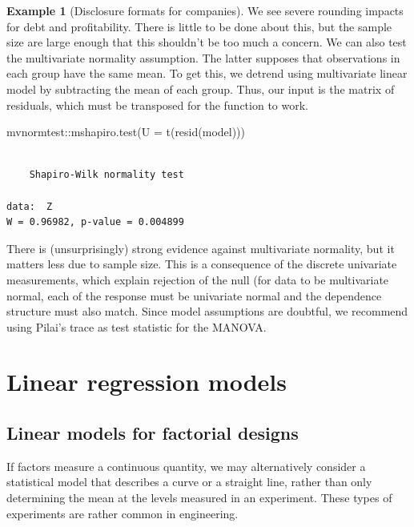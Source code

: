 \documentclass[
  11pt,
  letterpaper,
]{scrbook}
\newenvironment{Shaded}{\begin{snugshade}}{\end{snugshade}}
\newcommand{\AttributeTok}[1]{\textcolor[rgb]{0.40,0.45,0.13}{#1}}
\newcommand{\FunctionTok}[1]{\textcolor[rgb]{0.28,0.35,0.67}{#1}}
\newcommand{\NormalTok}[1]{\textcolor[rgb]{0.00,0.23,0.31}{#1}}
\newcommand{\SpecialCharTok}[1]{\textcolor[rgb]{0.37,0.37,0.37}{#1}}
\theoremstyle{definition}
\newtheorem{example}{Example}[chapter]
\theoremstyle{definition}
\theoremstyle{remark}
\begin{document}
\begin{example}[Disclosure formats for
companies]
We see severe rounding impacts for debt and profitability. There is
little to be done about this, but the sample size are large enough that
this shouldn't be too much a concern. We can also test the multivariate
normality assumption. The latter supposes that observations in each
group have the same mean. To get this, we detrend using multivariate
linear model by subtracting the mean of each group. Thus, our input is
the matrix of residuals, which must be transposed for the function to
work.

\begin{Shaded}
\begin{Highlighting}[]
\NormalTok{mvnormtest}\SpecialCharTok{::}\FunctionTok{mshapiro.test}\NormalTok{(}\AttributeTok{U =} \FunctionTok{t}\NormalTok{(}\FunctionTok{resid}\NormalTok{(model)))}
\end{Highlighting}
\end{Shaded}

\begin{verbatim}

    Shapiro-Wilk normality test

data:  Z
W = 0.96982, p-value = 0.004899
\end{verbatim}

There is (unsurprisingly) strong evidence against multivariate
normality, but it matters less due to sample size. This is a consequence
of the discrete univariate measurements, which explain rejection of the
null (for data to be multivariate normal, each of the response must be
univariate normal and the dependence structure must also match. Since
model assumptions are doubtful, we recommend using Pilai's trace as test
statistic for the MANOVA.

\end{example}


\chapter{Linear regression models}\label{linear-regression-models}

\section{Linear models for factorial
designs}\label{linear-models-for-factorial-designs}

If factors measure a continuous quantity, we may alternatively consider
a statistical model that describes a curve or a straight line, rather
than only determining the mean at the levels measured in an experiment.
These types of experiments are rather common in engineering.
\end{document}
